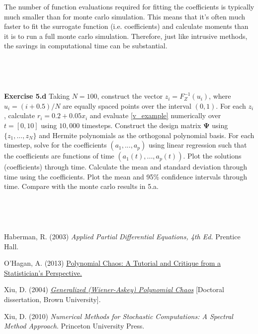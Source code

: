 \documentclass[11pt]{article}
\numberwithin{equation}{section}
\begin{document}
\qquad The number of function evaluations required for fitting the coefficients is typically much smaller than for monte carlo simulation. This means that it's often much faster to fit the surrogate function (i.e. coefficients) and calculate moments than it is to run a full monte carlo simulation. Therefore, just like intrusive methods, the savings in computational time can be substantial.



\

\

\textbf{Exercise 5.d} Taking $N = 100$, construct the vector $z_i = F_Z^{-1}(u_i)$, where $u_i = (i + 0.5)/N$ are equally spaced points over the interval $(0, 1)$. For each $z_i$, calculate $r_i = 0.2 + 0.05 x_i$ and evaluate \eqref{v_example} numerically over $t = [0, 10]$ using $10,000$ timesteps. Construct the design matrix $\mathbf{\Psi}$ using $\{ z_1, ..., z_N \}$ and Hermite polynomials as the orthogonal polynomial basis. For each timestep, solve for the coefficients $(a_1, ..., a_p)$ using linear regression such that the coefficients are functions of time $(a_1(t), ..., a_p(t))$. Plot the solutions (coefficients) through time. Calculate the mean and standard deviation through time using the coefficients. Plot the mean and 95\% confidence intervals through time. Compare with the monte carlo results in 5.a.

\

\




\begin{thebibliography}{9}

 Haberman, R. (2003) {\em Applied Partial Differential Equations, 4th Ed.} Prentice Hall.

 O'Hagan, A. (2013) \href{http://tonyohagan.co.uk/academic/pdf/Polynomial-chaos.pdf}{Polynomial Chaos: A Tutorial and Critique from a Statistician's Perspective.}


 Xiu, D. (2004) \href{https://www.brown.edu/research/projects/crunch/sites/brown.edu.research.projects.crunch/files/uploads/Dongbin\%20Xiu\%20Thesis.pdf}{\em Generalized (Wiener-Askey) Polynomial Chaos} [Doctoral dissertation, Brown University].

 Xiu, D. (2010) {\em Numerical Methods for Stochastic Computations: A Spectral Method Approach}. Princeton University Press.

\end{thebibliography}
\end{document}
